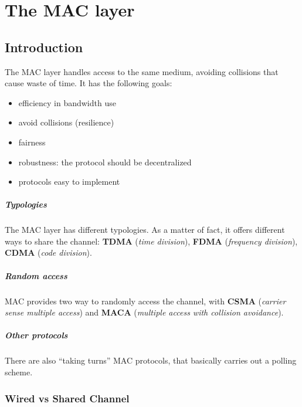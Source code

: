 \chapter{The MAC layer}

\section{Introduction}

The MAC layer handles access to the same medium, avoiding collisions that cause
waste of time.
It has the following goals:
\begin{itemize}
\item efficiency in bandwidth use
\item avoid collisions (resilience)
\item fairness
\item robustness: the protocol should be decentralized
\item protocols easy to implement
\end{itemize}

\paragraph*{Typologies} The MAC layer has different typologies. As a matter of
fact, it offers different ways to share the channel: \textbf{TDMA}
(\textit{time division}), \textbf{FDMA} (\textit{frequency division}),
\textbf{CDMA} (\textit{code division}).
\paragraph*{Random access} MAC provides two way to randomly access the channel,
with \textbf{CSMA} (\textit{carrier sense multiple access}) and \textbf{MACA}
(\textit{multiple access with collision avoidance}).
\paragraph*{Other protocols} There are also ``taking turns'' MAC protocols, that
basically carries out a
polling scheme.

\subsection{Wired vs Shared Channel}

